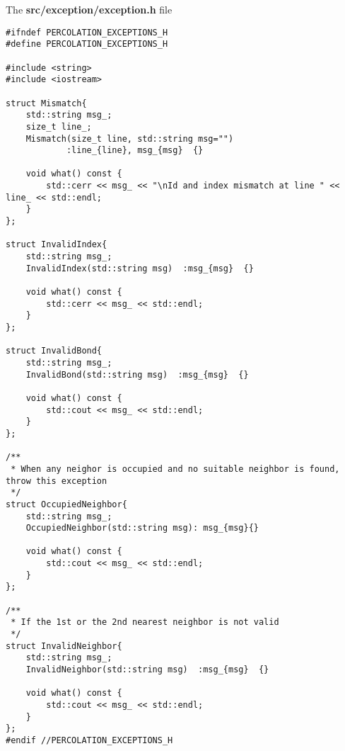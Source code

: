 
The \textbf{src/exception/exception.h} file

\begin{lstlisting}[style=CStyle]
#ifndef PERCOLATION_EXCEPTIONS_H
#define PERCOLATION_EXCEPTIONS_H

#include <string>
#include <iostream>

struct Mismatch{
    std::string msg_;
    size_t line_;
    Mismatch(size_t line, std::string msg="")
            :line_{line}, msg_{msg}  {}

    void what() const {
        std::cerr << msg_ << "\nId and index mismatch at line " << line_ << std::endl;
    }
};

struct InvalidIndex{
    std::string msg_;
    InvalidIndex(std::string msg)  :msg_{msg}  {}

    void what() const {
        std::cerr << msg_ << std::endl;
    }
};

struct InvalidBond{
    std::string msg_;
    InvalidBond(std::string msg)  :msg_{msg}  {}

    void what() const {
        std::cout << msg_ << std::endl;
    }
};

/**
 * When any neighor is occupied and no suitable neighbor is found, throw this exception
 */
struct OccupiedNeighbor{
    std::string msg_;
    OccupiedNeighbor(std::string msg): msg_{msg}{}

    void what() const {
        std::cout << msg_ << std::endl;
    }
};

/**
 * If the 1st or the 2nd nearest neighbor is not valid
 */
struct InvalidNeighbor{
    std::string msg_;
    InvalidNeighbor(std::string msg)  :msg_{msg}  {}

    void what() const {
        std::cout << msg_ << std::endl;
    }
};
#endif //PERCOLATION_EXCEPTIONS_H
\end{lstlisting}


